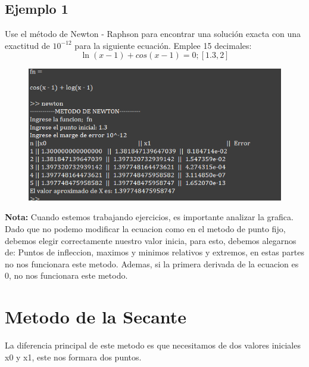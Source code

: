 \documentclass{article}
\theoremstyle{mytheoremstyle}
\theoremstyle{mytheoremstyle}
\theoremstyle{myproblemstyle}
\begin{document}
    \subsection*{Ejemplo 1}
    Use el método de Newton - Raphson para encontrar una solución exacta con una exactitud de $10^{-12}$ para la siguiente ecuación. Emplee 15 decimales: 
    \[
        \ln(x-1)+cos(x-1)=0 ; [1.3,2]
    \]
    \begin{figure}[ht]
        \includegraphics*[scale=0.9]{img/ejemplo3.png}
    \end{figure}
    
    \textbf{Nota:} Cuando estemos trabajando ejercicios, es importante analizar la grafica. Dado que no podemo modificar la ecuacion como en el metodo de punto fijo, debemos elegir correctamente nuestro valor inicia,
    para esto, debemos alegarnos de: Puntos de infleccion, maximos y minimos relativos y extremos, en estas partes no nos funcionara este metodo.
    Ademas, si la primera derivada de la ecuacion es 0, no nos funcionara este metodo.

\section*{Metodo de la Secante}
La diferencia principal de este metodo es que necesitamos de dos valores iniciales x0 y x1, este nos formara dos puntos.
\end{document}

